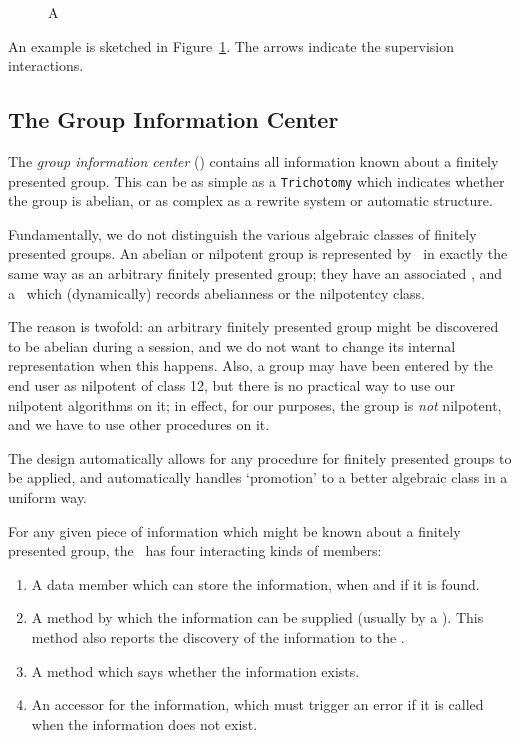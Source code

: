 \begin{figure}[hbtp]
\caption{A \GCM}\label{gcm}
\end{figure}

An example is sketched in Figure~\ref{gcm}. The arrows indicate the
supervision interactions.


\subsection{The Group Information Center}\label{gic}

The {\em group information center} (\GIC) contains all information
known about a finitely presented group. This can be as simple as a
{\tt Trichotomy} which indicates whether the group is abelian, or as
complex as a rewrite system or automatic structure.

Fundamentally, we do not distinguish the various algebraic classes of
finitely presented groups. An abelian or nilpotent group is
represented by \magnus\ in exactly the same way as an arbitrary
finitely presented group; they have an associated \GCM, and a \GIC\
which (dynamically) records abelianness or the nilpotentcy class.

The reason is twofold: an arbitrary finitely presented group might be
discovered to be abelian during a session, and we do not want to
change its internal representation when this happens. Also, a group
may have been entered by the end user as nilpotent of class 12, but
there is no practical way to use our nilpotent algorithms on it; in
effect, for our purposes, the group is {\em not} nilpotent, and we
have to use other procedures on it.

The design automatically allows for any procedure for finitely
presented groups to be applied, and automatically handles `promotion'
to a better algebraic class in a uniform way.

For any given piece of information which might be known about a
finitely presented group, the \GIC\ has four interacting kinds of
members:

\begin{enumerate}

\item
A data member which can store the information, when and if it is
found.

\item
A method by which the information can be supplied (usually by a \CM).
This method also reports the discovery of the information to the \FE.

\item
A method which says whether the information exists.

\item
An accessor for the information, which must trigger an error if it is
called when the information does not exist.

\end{enumerate}



